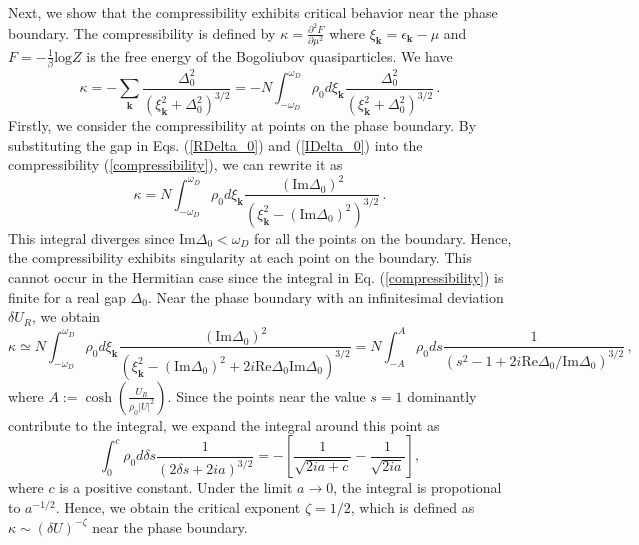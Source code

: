 \documentclass[aps,onecolumn,nofootinbib,superscriptaddress,notitlepage,longbibliography]{revtex4-1}
\begin{document}
Next, we show that the compressibility exhibits critical behavior near the phase boundary. The compressibility is defined by $\kappa=\frac{\partial^2F}{\partial\mu^2}$ where $\xi_{\bm{k}}=\epsilon_{\bm{k}}-\mu$ and $F=-\frac{1}{\beta}\text{log}Z$ is the free energy of the Bogoliubov quasiparticles. We have
\begin{equation}
  \kappa = - \sum_{\bm{k}} \frac{\Delta_0^2}{(\xi_{\bm{k}}^2 +
  \Delta_0^2)^{3 / 2}} = - N\int_{- \omega_D}^{\omega_D} \rho_0 d
  \xi_{\bm{k}} \frac{\Delta_0^2}{(\xi_{\bm{k}}^2 + \Delta_0^2)^{3
  / 2}}\,.
  \label{compressibility}
\end{equation}
Firstly, we consider the compressibility at points on the phase boundary. By substituting the gap in Eqs. (\ref{RDelta_0}) and (\ref{IDelta_0}) into the compressibility (\ref{compressibility}), we can rewrite it as
\begin{equation}
  \kappa= N\int_{- \omega_D}^{\omega_D} \rho_0 d \xi_{\bm{k}}
  \frac{(\text{Im} \Delta_0)^2}{(\xi_{\bm{k}}^2 - (\text{Im}
  \Delta_0)^2)^{3 / 2}}\,.
\end{equation}
This integral diverges since $\text{Im} \Delta_0 < \omega_D$ for all the points on the boundary. Hence, the compressibility exhibits singularity at each point on the boundary. This cannot occur in the Hermitian case since the integral in Eq. (\ref{compressibility}) is finite for a real gap $\Delta_0$. Near the phase boundary with an infinitesimal deviation $\delta U_R$, we obtain
\begin{equation}
	\kappa\simeq N\int_{- \omega_D}^{\omega_D} \rho_0 d \xi_{\bm{k}}
  \frac{(\text{Im} \Delta_0)^2}{(\xi_{\bm{k}}^2 - (\text{Im} \Delta_0)^2
  + 2 i \text{Re} \Delta_0 \text{Im} \Delta_0)^{3 / 2}} = N\int_{- A}^A \rho_0
  ds \frac{1}{(s^2 - 1 + 2 i \text{Re}
  \Delta_0 / \text{Im} \Delta_0)^{3 / 2}}\,,
\end{equation}
where $A := \cosh \left( \frac{U_R}{\rho_0 | U |^2} \right)$. Since the points near the value $s = 1$ dominantly contribute to the integral, we expand the integral around this point as
\begin{equation}
  \int_{0}^{c} \rho_0 d \delta s \frac{1}{(2 \delta
  s+ 2 i a)^{3 / 2}}=-[\frac{1}{\sqrt{2ia+c}}-\frac{1}{\sqrt{2ia}}],
\end{equation}
where $c$ is a positive constant. Under the limit $a\to0$, the integral is propotional to $a^{-1/2}$. Hence, we obtain the critical exponent $\zeta = 1 / 2$, which is defined as $\kappa \sim (\delta U)^{- \zeta}$ near the phase boundary.
\end{document}
